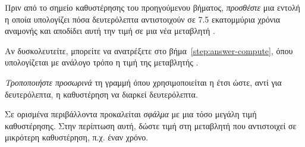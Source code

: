 \documentclass[a4paper,11pt,oneside]{book}
\begin{document}
\begin{step}
\label{step:wait-assign}
Πριν από το σημείο καθυστέρησης του προηγούμενου βήματος, \emph{προσθέστε} μια εντολή η οποία υπολογίζει πόσα δευτερόλεπτα αντιστοιχούν σε 7.5 εκατομμύρια χρόνια αναμονής και αποδίδει αυτή την τιμή σε μια νέα μεταβλητή .

Αν δυσκολευτείτε, μπορείτε να ανατρέξετε στο βήμα~\ref{step:answer-compute}, όπου υπολογίζεται με ανάλογο τρόπο η τιμή της μεταβλητής . 

\end{step}

\begin{step}
\label{step:delay-75}
\emph{Τροποποιήστε προσωρινά} τη γραμμή όπου χρησιμοποιείται η  έτσι ώστε, αντί για  δευτερόλεπτα, η καθυστέρηση να διαρκεί  δευτερόλεπτα.

\marginnote[2pt]{\iconcaution}
\begin{note}
Σε ορισμένα περιβάλλοντα προκαλείται \emph{σφάλμα} με μια τόσο μεγάλη τιμή καθυστέρησης. Στην περίπτωση αυτή, δώστε τιμή στη μεταβλητή  που αντιστοιχεί σε μικρότερη καθυστέρηση, π.χ. έναν χρόνο.
\end{note}




\end{step}
\end{document}
